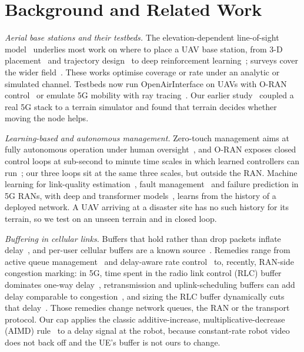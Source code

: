 \section{Background and Related Work}
\label{sec:related}

\textit{Aerial base stations and their testbeds.} The elevation-dependent
line-of-sight model~\cite{alhourani2014modeling} underlies most work on where
to place a UAV base station, from 3-D placement~\cite{boryaliniz2016efficient,
kalantari2016number} and trajectory design~\cite{wu2018common} to deep
reinforcement learning~\cite{qiu2020placement}; surveys cover the wider
field~\cite{zeng2016wireless,mozaffari2019tutorial}. These works optimise
coverage or rate under an analytic or simulated channel. Testbeds now run
OpenAirInterface on UAVs with O-RAN control~\cite{moore2024aerpaw} or emulate
5G mobility with ray tracing~\cite{iye2025owdt}. Our earlier
study~\cite{makhubela2026satnac} coupled a real 5G stack to a terrain
simulator and found that terrain decides whether moving the node helps.

\textit{Learning-based and autonomous management.} Zero-touch management aims
at fully autonomous operation under human oversight~\cite{coronado2022zsm}, and
O-RAN exposes closed control loops at sub-second to minute time scales in which
learned controllers can run~\cite{polese2023oran}; our three loops sit at the
same three scales, but outside the RAN.
Machine learning for link-quality estimation~\cite{cerar2021lqe}, fault
management~\cite{mulvey2019fault} and failure prediction in 5G RANs, with deep
and transformer models~\cite{islam2023dnn,hasan2024gentrap}, learns from the
history of a deployed network. A UAV arriving at a disaster site has no such
history for its terrain, so we test on an unseen terrain and in closed loop.

\textit{Buffering in cellular links.} Buffers that hold rather than drop
packets inflate delay~\cite{gettys2012bufferbloat}, and per-user cellular
buffers are a known source~\cite{jiang2012tackling}. Remedies range from active
queue management~\cite{nichols2012codel} and delay-aware rate
control~\cite{winstein2013sprout} to, recently, RAN-side congestion marking:
in 5G, time spent in the radio link control (RLC) buffer dominates one-way
delay~\cite{wan2025l4span}, retransmission and uplink-scheduling buffers can
add delay comparable to congestion~\cite{liu2025fog}, and sizing the RLC buffer
dynamically cuts that delay~\cite{irazabal2022buffer}. Those remedies change
network queues, the RAN or the transport protocol. Our cap applies the classic additive-increase,
multiplicative-decrease (AIMD) rule~\cite{chiu1989aimd} to a delay signal at the robot, because constant-rate
robot video does not back off and the UE's buffer is not ours to change.


